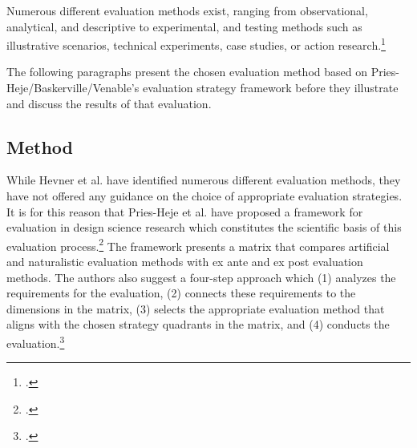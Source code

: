 
Numerous different evaluation methods exist, ranging from observational, analytical, and descriptive to experimental, and testing methods such as illustrative scenarios, technical experiments, case studies, or action research.\footcites[Cf.][p.86]{HevnerDesignScienceResearch2004}[cf.][p.4 et seq]{PfeffersDesignScienceResearch2012}

The following paragraphs present the chosen evaluation method based on Pries-Heje/Baskerville/Venable's evaluation strategy framework before they illustrate and discuss the results of that evaluation. 

\subsection{Method} \label{subsec:EvaluationMethod}

While Hevner et al. have identified numerous different evaluation methods, they have not offered any guidance on the choice of appropriate evaluation strategies. It is for this reason that Pries-Heje et al. have proposed a framework for evaluation in design science research which constitutes the scientific basis of this evaluation process.\footcites[Cf.][p.11 et seq]{Pries-HejeComprehensiveFrameworkEvaluation2012} The framework presents a matrix that compares artificial and naturalistic evaluation methods with ex ante and ex post evaluation methods. The authors also suggest a four-step approach which (1) analyzes the requirements for the evaluation, (2) connects these requirements to the dimensions in the matrix, (3) selects the appropriate evaluation method that aligns with the chosen strategy quadrants in the matrix, and (4) conducts the evaluation.\footcites[Cf.][p.13]{Pries-HejeComprehensiveFrameworkEvaluation2012} 

